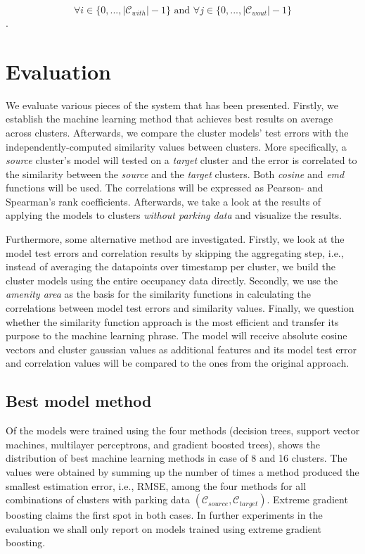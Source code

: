 	$$\forall i \in \{0,...,|\mathcal{C}_{with}|-1\} \text{ and } \forall j \in \{0,...,|\mathcal{C}_{wout}|-1\}$$.
		
	\section{Evaluation}
	We evaluate various pieces of the system that has been presented. Firstly, we  establish the machine learning method that achieves best results on average across clusters. Afterwards, we compare the cluster models' test errors with the independently-computed similarity values between clusters. More specifically, a \textit{source} cluster's model will tested on a \textit{target} cluster and the error is correlated to the similarity between the \textit{source} and the \textit{target} clusters. Both \textit{cosine} and \textit{emd} functions will be used. The correlations will be expressed as Pearson- and Spearman's rank coefficients. Afterwards, we take a look at the results of applying the models to clusters \textit{without parking data} and visualize the results. 
	
	Furthermore, some alternative method are investigated. Firstly, we look at the model test errors and correlation results by skipping the aggregating step, i.e., instead of averaging the datapoints over timestamp per cluster, we build the cluster models using the entire occupancy data directly. Secondly, we use the \textit{amenity area} as the basis for the similarity functions in calculating the correlations between model test errors and similarity values. Finally, we question whether the similarity function approach is the most efficient and transfer its purpose to the machine learning phrase. The model will receive absolute cosine vectors and cluster gaussian values as additional features and its model test error and correlation values will be compared to the ones from the original approach.
	
	\subsection{Best model method}
	Of the models were trained using the four methods (decision trees, support vector machines, multilayer perceptrons, and gradient boosted trees),  shows the distribution of best machine learning methods in case of 8 and 16 clusters. The values were obtained by summing up the number of times a method produced the smallest estimation error, i.e., RMSE, among the four methods for all combinations of clusters with parking data $(\mathcal{C}_{source}, \mathcal{C}_{target})$.
	Extreme gradient boosting claims the first spot in both cases.
	In further experiments in the evaluation we shall only report on models trained using extreme gradient boosting.
	

